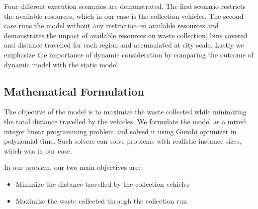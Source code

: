 \documentclass[12pt]{article}
\begin{document}
Four different execution scenarios are demonstrated. The first scenario restricts the available resources, which in our case is the collection vehicles. The second case runs the model without any restriction on available resources and demonstrates the impact of available resources on waste collection, bins covered and distance travelled for each region and accumulated at city scale. Lastly we emphasize the importance of dynamic consideration by comparing the outcome of dynamic model with the static model.

\subsection {Mathematical Formulation}

The objective of the model is to maximize the waste collected while minimizing the total distance travelled by the vehicles. We formulate the model as a mixed integer linear programming problem and solved it using Gurobi optimizer \cite{gurobi} in polynomial time. Such solvers can solve problems with realistic instance sizes, which was in our case.

In our problem, our two main objectives are:
\begin{itemize}
    \item Minimize the distance travelled by the collection vehicles
    \item Maximize the waste collected through the collection run
\end{itemize}
\end{document}
